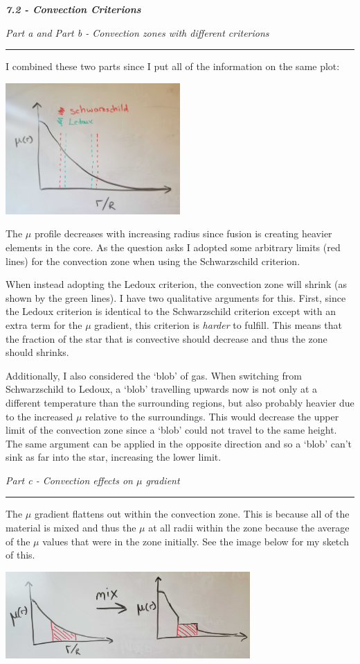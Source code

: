 \documentclass[12pt, letterpaper, twoside]{article}
\newcommand{\question}[1]{{\noindent \it #1}}
\newcommand{\answer}[1]{
    \par\noindent\rule{\textwidth}{0.4pt}#1\vspace{0.5cm}
}
\begin{document}
\question{\textbf{7.2 - Convection Criterions}}

\question{Part a and Part b - Convection zones with different criterions}
\answer{
    I combined these two parts since I put all of the information on the same plot:
    \begin{center}
        \includegraphics[width=0.5\textwidth]{figures/criterion_shift_zones.jpg}
    \end{center}
    The $\mu$ profile decreases with increasing radius since fusion is creating heavier elements in the core. As the question asks I adopted some arbitrary limits (red lines) for the convection zone when using the Schwarzschild criterion.

    When instead adopting the Ledoux criterion, the convection zone will shrink (as shown by the green lines). I have two qualitative arguments for this. First, since the Ledoux criterion is identical to the Schwarzschild criterion except with an extra term for the $\mu$ gradient, this criterion is \textit{harder} to fulfill. This means that the fraction of the star that is convective should decrease and thus the zone should shrinks.

    Additionally, I also considered the `blob' of gas. When switching from Schwarzschild to Ledoux, a `blob' travelling upwards now is not only at a different temperature than the surrounding regions, but also probably heavier due to the increased $\mu$ relative to the surroundings. This would decrease the upper limit of the convection zone since a `blob' could not travel to the same height. The same argument can be applied in the opposite direction and so a `blob' can't sink as far into the star, increasing the lower limit.
}

\question{Part c - Convection effects on $\mu$ gradient}
\answer{
    The $\mu$ gradient flattens out within the convection zone. This is because all of the material is mixed and thus the $\mu$ at all radii within the zone because the average of the $\mu$ values that were in the zone initially. See the image below for my sketch of this.
    \begin{center}
        \includegraphics[width=0.7\textwidth]{figures/mixing.jpg}
    \end{center}
}
\end{document}
